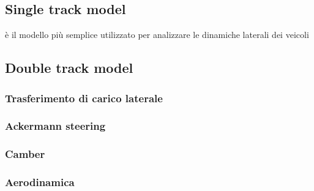 \subsection{Single track model}
è il modello più semplice utilizzato per analizzare le dinamiche laterali dei veicoli
\subsection{Double track model}
\subsubsection{Trasferimento di carico laterale}
\subsubsection{Ackermann steering}
\subsubsection{Camber}
\subsubsection{Aerodinamica}
